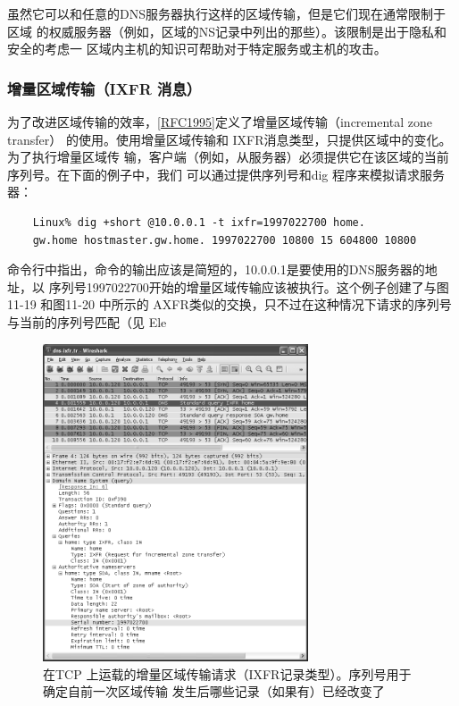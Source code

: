 虽然它可以和任意的DNS服务器执行这样的区域传输，但是它们现在通常限制于区域
的权威服务器（例如，区域的NS记录中列出的那些）。该限制是出于隐私和安全的考虑一
区域内主机的知识可帮助对于特定服务或主机的攻击。

\subsubsection{增量区域传输（IXFR 消息）}

为了改进区域传输的效率，\href{https://www.rfc-editor.org/rfc/rfc1995}{[RFC1995]}定义了增量区域传输（incremental zone transfer）
的使用。使用增量区域传输和 IXFR消息类型，只提供区域中的变化。为了执行增量区域传
输，客户端（例如，从服务器）必须提供它在该区域的当前序列号。在下面的例子中，我们
可以通过提供序列号和dig 程序来模拟请求服务器：

\begin{verbatim}
    Linux% dig +short @10.0.0.1 -t ixfr=1997022700 home.
    gw.home hostmaster.gw.home. 1997022700 10800 15 604800 10800
\end{verbatim}

命令行中指出，命令的输出应该是简短的，10.0.0.1是要使用的DNS服务器的地址，以
序列号1997022700开始的增量区域传输应该被执行。这个例子创建了与图11-19 和图11-20
中所示的 AXFR类似的交换，只不过在这种情况下请求的序列号与当前的序列号匹配（见
Ele

\begin{figure}[!htb]
    \centering
	\includegraphics[width=0.7\textwidth]{imgs/11/11-21.png}
	\caption{在TCP 上运载的增量区域传输请求（IXFR记录类型）。序列号用于确定自前一次区域传输
            发生后哪些记录（如果有）已经改变了}
\end{figure}

